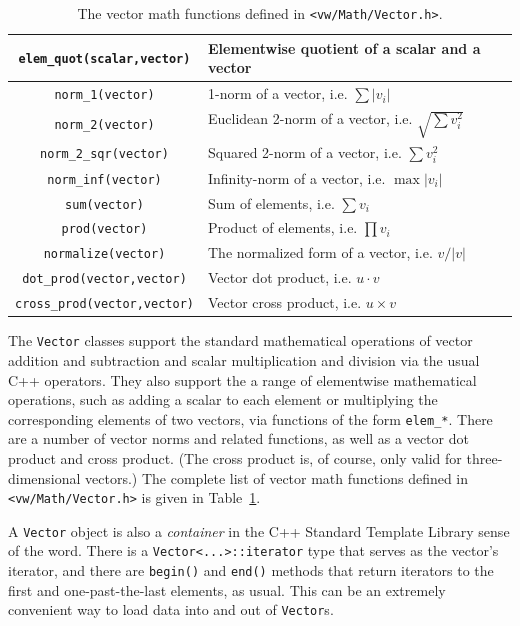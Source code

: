 \begin{table}[t!]
\begin{centering}
\begin{tabular}{|c|l|}
\verb#elem_quot(scalar,vector)# & Elementwise quotient of a scalar and a vector \\ \hline
\hline
\verb#norm_1(vector)# & 1-norm of a vector, i.e. $\sum |v_i|$ \\ \hline
\verb#norm_2(vector)# & Euclidean 2-norm of a vector, i.e. $\sqrt{\sum v_i^2}$ \\ \hline
\verb#norm_2_sqr(vector)# & Squared 2-norm of a vector, i.e. $\sum v_i^2$ \\ \hline
\verb#norm_inf(vector)# & Infinity-norm of a vector, i.e. $\max |v_i|$ \\ \hline
\verb#sum(vector)# & Sum of elements, i.e. $\sum v_i$ \\ \hline
\verb#prod(vector)# & Product of elements, i.e. $\prod v_i$ \\ \hline
\verb#normalize(vector)# & The normalized form of a vector, i.e. $v/|v|$ \\ \hline
\verb#dot_prod(vector,vector)# & Vector dot product, i.e. $u\cdot v$ \\ \hline
\verb#cross_prod(vector,vector)# & Vector cross product, i.e. $u\times v$ \\ \hline
\end{tabular}
\caption{The vector math functions defined in {\tt <vw/Math/Vector.h>}.}
\label{tbl:vector-functions}
\end{centering}\end{table}

The \verb#Vector# classes support the standard mathematical operations
of vector addition and subtraction and scalar multiplication and
division via the usual C++ operators.  They also support the a range
of elementwise mathematical operations, such as adding a scalar to
each element or multiplying the corresponding elements of two vectors,
via functions of the form \verb#elem_*#.  There are a number of vector
norms and related functions, as well as a vector dot product and cross
product.  (The cross product is, of course, only valid for
three-dimensional vectors.)  The complete list of vector math
functions defined in \verb#<vw/Math/Vector.h># is given in
Table~\ref{tbl:vector-functions}.

A \verb#Vector# object is also a {\em container} in the C++ Standard Template 
Library sense of the word.  There is a \verb#Vector<...>::iterator# type 
that serves as the vector's iterator, and there are \verb#begin()# and 
\verb#end()# methods that return iterators to the first and one-past-the-last 
elements, as usual.  This can be an extremely convenient way to load 
data into and out of \verb#Vector#s.

